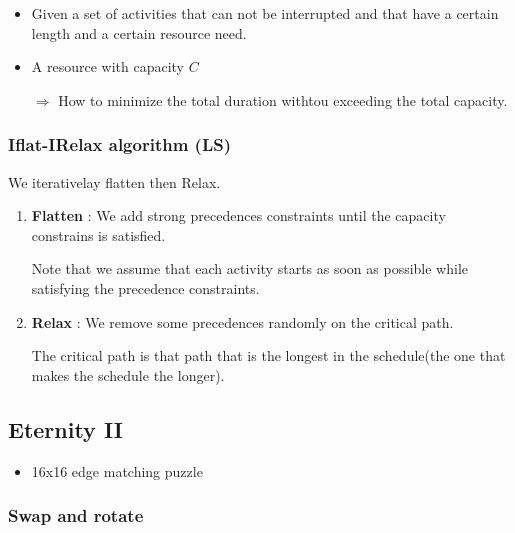 \begin{itemize}
    \item Given a set of activities that can not be interrupted and
        that have a certain length and a certain resource need.
    \item A resource with capacity $C$
    \item[$\Rightarrow$] How to minimize the total duration withtou
        exceeding the total capacity.
\end{itemize}

\subsubsection{Iflat-IRelax algorithm (LS)}

We iterativelay flatten then Relax.
\begin{enumerate}
    \item \textbf{Flatten} : We add strong precedences constraints until
        the capacity constrains is satisfied.

        Note that we assume that each
        activity starts as soon as possible while satisfying
        the precedence constraints.

    \item \textbf{Relax} : We remove some precedences randomly on the critical
        path.

        The critical path is that path that is the longest in the
        schedule(the one that makes the schedule the longer).
\end{enumerate}

\subsection{Eternity II}
\begin{itemize}
    \item 16x16 edge matching puzzle
    \end{itemize}

\subsubsection{Swap and rotate}

